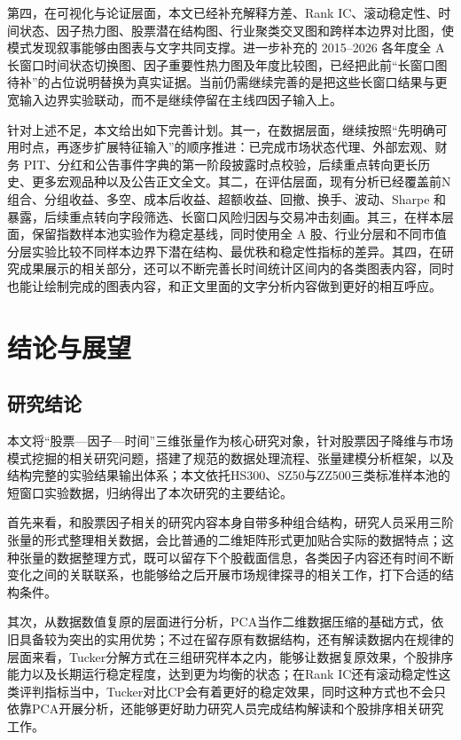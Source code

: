 第四，在可视化与论证层面，本文已经补充解释方差、Rank IC、滚动稳定性、时间状态、因子热力图、股票潜在结构图、行业聚类交叉图和跨样本边界对比图，使模式发现叙事能够由图表与文字共同支撑。进一步补充的 2015--2026 各年度全 A 长窗口时间状态切换图、因子重要性热力图及年度比较图，已经把此前“长窗口图待补”的占位说明替换为真实证据。当前仍需继续完善的是把这些长窗口结果与更宽输入边界实验联动，而不是继续停留在主线四因子输入上。

针对上述不足，本文给出如下完善计划。其一，在数据层面，继续按照“先明确可用时点，再逐步扩展特征输入”的顺序推进：已完成市场状态代理、外部宏观、财务 PIT、分红和公告事件字典的第一阶段披露时点校验，后续重点转向更长历史、更多宏观品种以及公告正文全文。其二，在评估层面，现有分析已经覆盖前N组合、分组收益、多空、成本后收益、超额收益、回撤、换手、波动、Sharpe 和暴露，后续重点转向字段筛选、长窗口风险归因与交易冲击刻画。其三，在样本层面，保留指数样本池实验作为稳定基线，同时使用全 A 股、行业分层和不同市值分层实验比较不同样本边界下潜在结构、最优秩和稳定性指标的差异。其四，在研究成果展示的相关部分，还可以不断完善长时间统计区间内的各类图表内容，同时也能让绘制完成的图表内容，和正文里面的文字分析内容做到更好的相互呼应。

\chapter{结论与展望}

\section{研究结论}

本文将“股票—因子—时间”三维张量作为核心研究对象，针对股票因子降维与市场模式挖掘的相关研究问题，搭建了规范的数据处理流程、张量建模分析框架，以及结构完整的实验结果输出体系；本文依托HS300、SZ50与ZZ500三类标准样本池的短窗口实验数据，归纳得出了本次研究的主要结论。

首先来看，和股票因子相关的研究内容本身自带多种组合结构，研究人员采用三阶张量的形式整理相关数据，会比普通的二维矩阵形式更加贴合实际的数据特点；这种张量的数据整理方式，既可以留存下个股截面信息，各类因子内容还有时间不断变化之间的关联联系，也能够给之后开展市场规律探寻的相关工作，打下合适的结构条件。

其次，从数据数值复原的层面进行分析，PCA当作二维数据压缩的基础方式，依旧具备较为突出的实用优势；不过在留存原有数据结构，还有解读数据内在规律的层面来看，Tucker分解方式在三组研究样本之内，能够让数据复原效果，个股排序能力以及长期运行稳定程度，达到更为均衡的状态；在Rank IC还有滚动稳定性这类评判指标当中，Tucker对比CP会有着更好的稳定效果，同时这种方式也不会只依靠PCA开展分析，还能够更好助力研究人员完成结构解读和个股排序相关研究工作。

